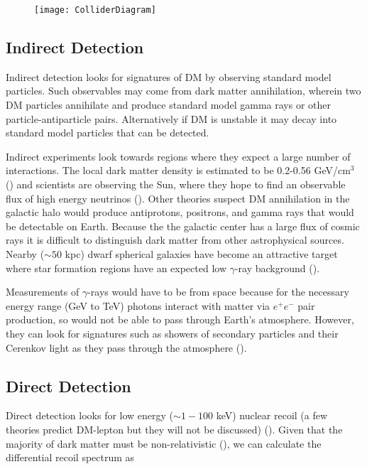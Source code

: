 \begin{figure}
\centering
\texttt{[image: ColliderDiagram]}
\label{fig:collider}
\end{figure}


\subsection{Indirect Detection} \label{subsec:indirect}
Indirect detection looks for signatures of DM by observing standard model particles.  Such observables
may come from dark matter annihilation, wherein two DM particles annihilate and produce standard model
gamma rays or other particle-antiparticle pairs.  Alternatively if DM is unstable it may decay into
standard model particles that can be detected.

Indirect experiments look towards regions where they expect a large number of interactions.  The local
dark matter density is estimated to be 0.2-0.56 GeV/cm$^{3}$ () and scientists are observing
the Sun, where they hope to find an observable flux of high energy neutrinos ().  Other theories suspect
DM annihilation in the galactic halo would produce
antiprotons, positrons, and gamma rays that would be detectable on Earth.  Because the the galactic center
has a large flux of cosmic rays it is difficult to distinguish dark matter from other astrophysical
sources.  Nearby ($\sim 50$ kpc) dwarf spherical
galaxies have become an attractive target where star formation regions have an expected low $\gamma$-ray
background ().

Measurements of $\gamma$-rays would have to be from space because for the necessary energy range (GeV to TeV) photons interact
with matter via $e^{+}e^{-}$ pair production, so would not be able to pass through Earth's atmosphere.  However,
they can look for signatures such as showers of secondary particles and their Cerenkov
light as they pass through the atmosphere ().



\subsection{Direct Detection} \label{subsec:direct}
Direct detection looks for low energy ($\sim 1-100$ keV) nuclear recoil (a few theories predict DM-lepton
but they will not be discussed) ().  Given that the majority of dark matter must be
non-relativistic (), we can calculate the differential recoil spectrum as 

